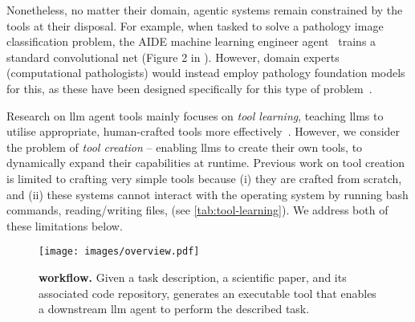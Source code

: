 Nonetheless, no matter their domain, agentic systems remain constrained by the tools at their disposal. 
For example, when tasked to solve a pathology image classification problem, the AIDE machine learning engineer agent~\cite{weco2025introducing} trains a standard convolutional net (\cf Figure 2 in \citet{chan2024mlebench}).
However, domain experts (computational pathologists) would instead employ pathology foundation models for this, as these have been designed specifically for this type of problem~\cite{chen2024uni,zimmermann2024virchow2,filiot2024phikonv2,wolflein2023good}.

Research on \gls{llm} agent tools mainly focuses on \emph{tool learning}, \ie teaching \glspl{llm} to utilise appropriate, human-crafted tools more effectively~\cite{qin2024toollearning,schick2023toolformer}.
However, we consider the problem of \emph{tool creation} -- enabling \glspl{llm} to create their own tools, to dynamically expand their capabilities at runtime.
Previous work on tool creation~\cite{cai2024toolmakers,yuan2024craft, qian2023creator} is limited to crafting very simple tools because (i) they are crafted from scratch, and (ii) these systems cannot interact with the operating system by running bash commands, reading/writing files, \etc (see \cref{tab:tool-learning}). We address both of these limitations below.
\begin{table}[h]
  \caption{Comparison of tool creation methods. \emph{OS interaction} refers to the ability to interact with the operating system (\eg read/write files, run commands, web browsing). \emph{Complex tasks} require installing and using external dependencies (\eg libraries, model weights).}
  \label{tab:tool-learning}
\end{table}






\begin{figure*}[t]
  \texttt{[image: images/overview.pdf]}
  \caption{\textbf{\Ours workflow.}
    Given a task description, a scientific paper, and its associated code repository, \ours generates an executable tool that enables a downstream \gls{llm} agent to perform the described task.
  }
  \label{fig:overview}
\end{figure*}